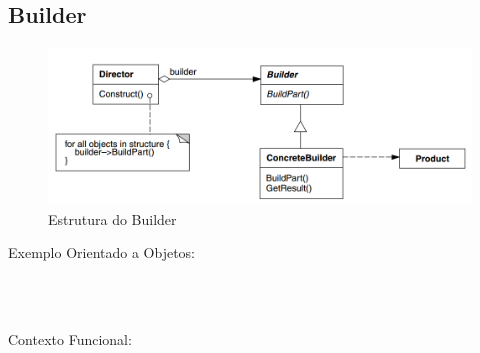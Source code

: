 \subsection{Builder}

\begin{figure}[htb]
	\caption{\label{fig_grafico}Estrutura do Builder}
	\begin{center}
	    \includegraphics[scale=0.5]{5_padroes-contexto-funcional/5.1_criacionais/5.1.3_builder/diagram.png}
	\end{center}
\end{figure}

Exemplo Orientado a Objetos:

\begin{lstlisting}[caption={Builder Orientado a Objetos},label=oobuilder]



\end{lstlisting}

Contexto Funcional:


\begin{lstlisting}[caption={Builder Funcional},label=fpbuilder]
    

    
\end{lstlisting}
